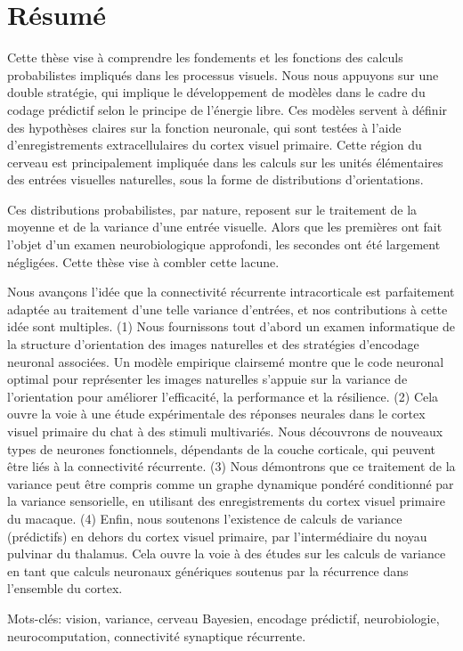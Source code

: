 \chapter*{Résumé}

Cette thèse vise à comprendre les fondements et les fonctions des calculs probabilistes impliqués dans les processus visuels.  Nous nous appuyons sur une double stratégie, qui implique le développement de modèles dans le cadre du codage prédictif selon le principe de l'énergie libre. 
Ces modèles servent à définir des hypothèses claires sur la fonction neuronale, qui sont testées à l'aide d'enregistrements extracellulaires du cortex visuel primaire. Cette région du cerveau est principalement impliquée dans les calculs sur les unités élémentaires des entrées visuelles naturelles, sous la forme de distributions d'orientations.

Ces distributions probabilistes, par nature, reposent sur le traitement de la moyenne et de la variance d'une entrée visuelle. Alors que les premières ont fait l'objet d'un examen neurobiologique approfondi, les secondes ont été largement négligées. Cette thèse vise à combler cette lacune.

Nous avançons l'idée que la connectivité récurrente intracorticale est parfaitement adaptée au traitement d'une telle variance d'entrées, et nos contributions à cette idée sont multiples. 
(1) Nous fournissons tout d'abord un examen informatique de la structure d'orientation des images naturelles et des stratégies d'encodage neuronal associées. Un modèle empirique clairsemé montre que le code neuronal optimal pour représenter les images naturelles s'appuie sur la variance de l'orientation pour améliorer l'efficacité, la performance et la résilience.  
(2) Cela ouvre la voie à une étude expérimentale des réponses neurales dans le cortex visuel primaire du chat à des stimuli multivariés. Nous découvrons de nouveaux types de neurones fonctionnels, dépendants de la couche corticale, qui peuvent être liés à la connectivité récurrente. 
(3) Nous démontrons que ce traitement de la variance peut être compris comme un graphe dynamique pondéré conditionné par la variance sensorielle, en utilisant des enregistrements du cortex visuel primaire du macaque.
(4) Enfin, nous soutenons l'existence de calculs de variance (prédictifs) en dehors du cortex visuel primaire, par l'intermédiaire du noyau pulvinar du thalamus. Cela ouvre la voie à des études sur les calculs de variance en tant que calculs neuronaux génériques soutenus par la récurrence dans l'ensemble du cortex.


\vspace{0.25cm}
Mots-clés: vision, variance, cerveau Bayesien, encodage prédictif, neurobiologie, neurocomputation, connectivité synaptique récurrente.

